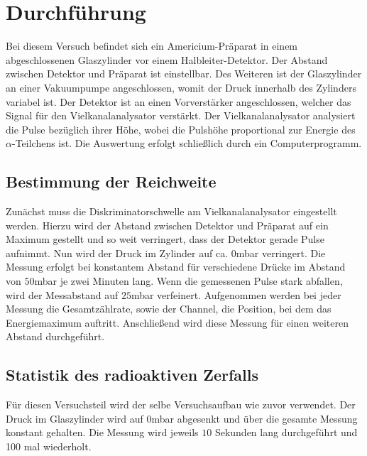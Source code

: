 \section{Durchführung}
\label{sec:Durchführung}
    Bei diesem Versuch befindet sich ein Americium-Präparat in einem abgeschlossenen Glaszylinder vor einem Halbleiter-Detektor. Der Abstand
    zwischen Detektor und Präparat ist einstellbar. Des Weiteren ist der Glaszylinder an einer Vakuumpumpe angeschlossen, womit der Druck
    innerhalb des Zylinders variabel ist. Der Detektor ist an einen Vorverstärker angeschlossen, welcher das Signal für den Vielkanalanalysator
    verstärkt. Der Vielkanalanalysator analysiert die Pulse bezüglich ihrer Höhe, wobei die Pulshöhe proportional zur Energie
    des $\alpha$-Teilchens ist. Die Auswertung erfolgt schließlich durch ein Computerprogramm.
    \subsection{Bestimmung der Reichweite}
        Zunächst muss die Diskriminatorschwelle am Vielkanalanalysator eingestellt werden. Hierzu wird der Abstand zwischen Detektor und 
        Präparat auf ein Maximum gestellt und so weit verringert, dass der Detektor gerade Pulse aufnimmt. Nun wird der Druck im Zylinder
        auf ca. $0$mbar verringert. Die Messung erfolgt bei konstantem Abstand für verschiedene Drücke im Abstand von $50$mbar je zwei Minuten 
        lang. Wenn die gemessenen Pulse stark abfallen, wird der Messabstand auf $25$mbar verfeinert. Aufgenommen werden bei jeder Messung
        die Gesamtzählrate, sowie der Channel, die Position, bei dem das Energiemaximum auftritt. 
        Anschließend wird diese Messung für einen weiteren Abstand durchgeführt. 
    \subsection{Statistik des radioaktiven Zerfalls}    
        Für diesen Versuchsteil wird der selbe Versuchsaufbau wie zuvor verwendet. Der Druck im Glaszylinder wird auf $0$mbar abgesenkt und über
        die gesamte Messung konstant gehalten. Die Messung wird jeweils $10$ Sekunden lang durchgeführt und 100 mal wiederholt.